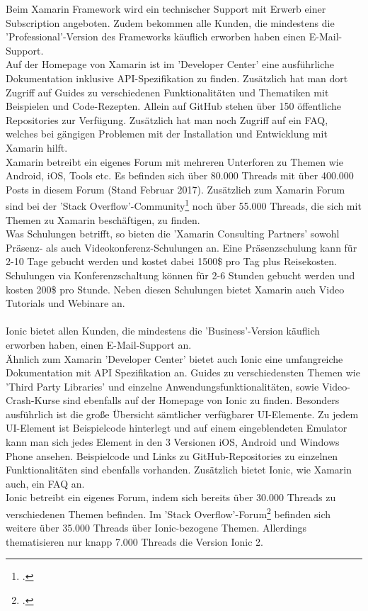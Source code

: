 Beim Xamarin Framework wird ein technischer Support mit Erwerb einer Subscription angeboten. Zudem bekommen alle Kunden, die mindestens die 'Professional'-Version des Frameworks käuflich erworben haben einen E-Mail-Support. 
\\
Auf der Homepage von Xamarin ist im 'Developer Center' eine ausführliche Dokumentation inklusive API-Spezifikation zu finden. Zusätzlich hat man dort Zugriff auf Guides zu verschiedenen Funktionalitäten und Thematiken mit Beispielen und Code-Rezepten. Allein auf GitHub stehen über 150 öffentliche Repositories zur Verfügung. Zusätzlich hat man noch Zugriff auf ein FAQ, welches bei gängigen Problemen mit der Installation und Entwicklung mit Xamarin hilft. 
\\
Xamarin betreibt ein eigenes Forum mit mehreren Unterforen zu Themen wie Android, iOS, Tools etc. Es befinden sich über 80.000 Threads mit über 400.000 Posts in diesem Forum (Stand Februar 2017). Zusätzlich zum Xamarin Forum sind bei der 'Stack Overflow'-Community\footcite{StackOverfolw} noch über 55.000 Threads, die sich mit Themen zu Xamarin beschäftigen, zu finden. 
\\
Was Schulungen betrifft, so bieten die 'Xamarin Consulting Partners' sowohl Präsenz- als auch Videokonferenz-Schulungen an. Eine Präsenzschulung kann für 2-10 Tage gebucht werden und kostet dabei 1500\$ pro Tag plus Reisekosten. Schulungen via Konferenzschaltung können für 2-6 Stunden gebucht werden und kosten 200\$ pro Stunde. Neben diesen Schulungen bietet Xamarin auch Video Tutorials und Webinare an. 
\\
\\
Ionic bietet allen Kunden, die mindestens die 'Business'-Version käuflich erworben haben, einen E-Mail-Support an. 
\\
Ähnlich zum Xamarin 'Developer Center' bietet auch Ionic eine umfangreiche Dokumentation mit API Spezifikation an. Guides zu verschiedensten Themen wie 'Third Party Libraries' und einzelne Anwendungsfunktionalitäten, sowie Video-Crash-Kurse sind ebenfalls auf der Homepage von Ionic zu finden. Besonders ausführlich ist die große Übersicht sämtlicher verfügbarer UI-Elemente. Zu jedem UI-Element ist Beispielcode hinterlegt und auf einem eingeblendeten Emulator kann man sich jedes Element in den 3 Versionen iOS, Android und Windows Phone ansehen. Beispielcode und Links zu GitHub-Repositories zu einzelnen Funktionalitäten sind ebenfalls vorhanden. Zusätzlich bietet Ionic, wie Xamarin auch, ein FAQ an. 
\\
Ionic betreibt ein eigenes Forum, indem sich bereits über 30.000 Threads zu verschiedenen Themen befinden. Im 'Stack Overflow'-Forum\footcite{StackOverfolw} befinden sich weitere über 35.000 Threads über Ionic-bezogene Themen. Allerdings thematisieren nur knapp 7.000 Threads die Version Ionic 2. 
